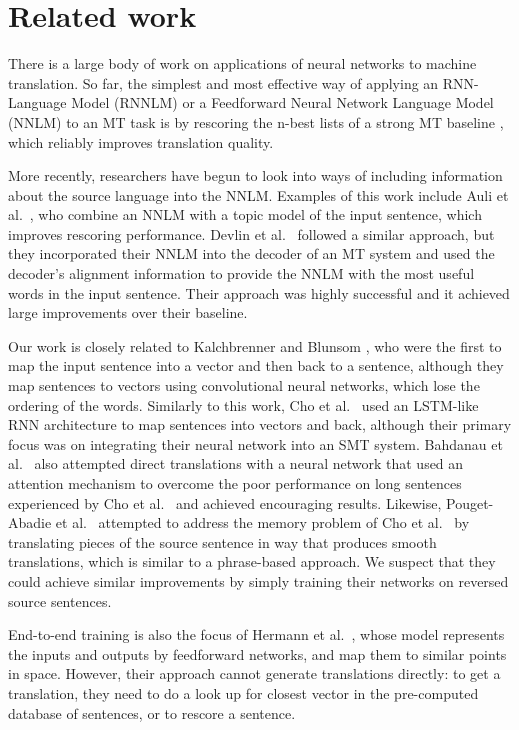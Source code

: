\section{Related work}
\label{sec:rel_work}

There is a large body of work on applications of neural networks to
machine translation. So far, the simplest and most effective way of
applying an RNN-Language Model (RNNLM) \cite{mikolov2010recurrent} or
a Feedforward Neural Network Language Model (NNLM) \cite{bengio} to an
MT task is by rescoring the n-best lists of a strong MT baseline
\cite{mikolov2012}, which reliably improves translation quality.

More recently, researchers have begun to look into ways of including
information about the source language into the NNLM.  Examples of this
work include Auli et al.~\cite{auli13}, who combine an NNLM with a
topic model of the input sentence, which improves rescoring
performance.  Devlin et al.~\cite{devlin14} followed a similar
approach, but they incorporated their NNLM into the decoder of an MT
system and used the decoder's alignment information to provide the
NNLM with the most useful words in the input sentence.  Their approach
was highly successful and it achieved large improvements over their
baseline.

Our work is closely related to Kalchbrenner and Blunsom \cite{kal13},
who were the first to map the input sentence into a vector and then
back to a sentence, although they map sentences to vectors using
convolutional neural networks, which lose the ordering of the words.
Similarly to this work, Cho et al.~\cite{cho14} used an LSTM-like RNN
architecture to map sentences into vectors and back, although their
primary focus was on integrating their neural network into an SMT
system.  Bahdanau et al.~\cite{bog14} also attempted direct
translations with a neural network that used an attention mechanism to
overcome the poor performance on long sentences experienced by Cho et
al.~\cite{cho14} and achieved encouraging results.  Likewise,
Pouget-Abadie et al.~\cite{curse} attempted to address the memory
problem of Cho et al.~\cite{cho14} by translating pieces of the source
sentence in way that produces smooth translations, which is similar to
a phrase-based approach.  We suspect that they could achieve similar
improvements by simply training their networks on reversed source
sentences.


End-to-end training is also the focus of Hermann et
al.~\cite{hermann14}, whose model represents the inputs and outputs by
feedforward networks, and map them to similar points in
space. However, their approach cannot generate translations directly:
to get a translation, they need to do a look up for closest vector in
the pre-computed database of sentences, or to rescore a sentence.

